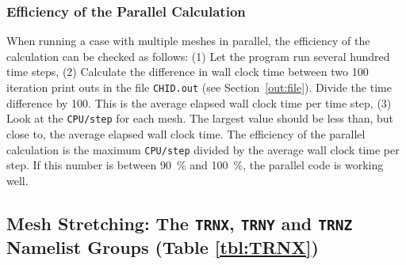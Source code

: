 \documentclass[11pt]{book}
\newcommand{\ct}{\tt\small}
\begin{document}
\subsubsection{Efficiency of the Parallel Calculation}

When running a case with multiple meshes in parallel, the efficiency of the
calculation can be checked as follows: (1) Let the program run several hundred time steps, (2) Calculate
the difference in wall clock time between two 100 iteration print outs in
the file {\ct CHID.out} (see Section~\ref{out:file}).
Divide the time difference by 100. This is the average
elapsed wall clock time per time step, (3) Look at the {\ct CPU/step} for each mesh. The
largest value should be less than, but close to, the average elapsed wall clock time.
The efficiency of the parallel calculation is the maximum {\ct CPU/step} divided by
the average wall clock time per step. If this number is between 90~\% and 100~\%, the
parallel code is working well.



\subsection{Mesh Stretching: The \texorpdfstring{{\tt TRNX}}{TRNX}, \texorpdfstring{{\tt TRNY}}{TRNY} and \texorpdfstring{{\tt TRNZ}}{TRNZ} Namelist Groups (Table \ref{tbl:TRNX})}
\label{info:TRNX}
\end{document}
